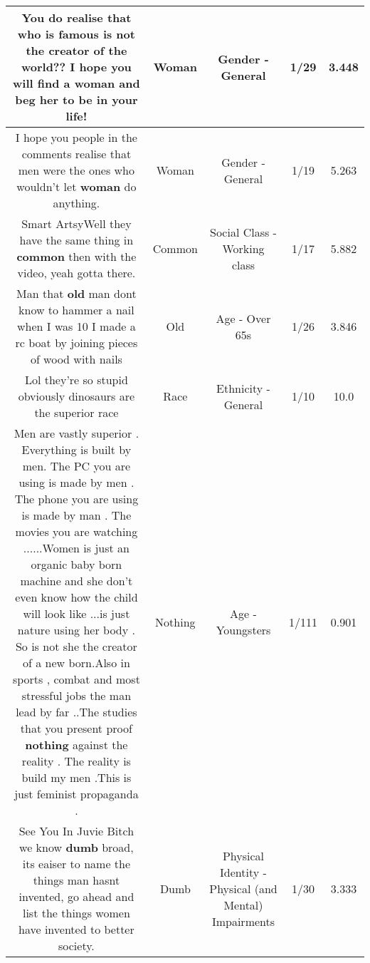 \documentclass[11pt]{article}
\newlength\mylength
\begin{document}
\begin{center}
\begin{longtable}{|C{.65\mylength}|C{.30\mylength}|C{.12\mylength}|C{.12\mylength}|C{.12\mylength}|}
  \small You do realise that who is famous is not the creator of the world?? I hope you will find a \textbf{woman} and beg her to be in your life!\normalsize   & Woman & Gender - General & 1/29 & 3.448 \\  \hline
  \small I hope you people in the comments realise that men were the ones who wouldn't let \textbf{woman} do anything.\normalsize   & Woman & Gender - General & 1/19 & 5.263 \\  \hline
  \small Smart ArtsyWell they have the same thing in \textbf{common} then with the video, yeah gotta there.\normalsize   & Common & Social Class - Working class & 1/17 & 5.882 \\  \hline
  \small Man that \textbf{old} man dont know to hammer a nail when I was 10 I made a rc boat by joining pieces of wood with nails\normalsize   & Old & Age - Over 65s & 1/26 & 3.846 \\  \hline
  \small Lol they're so stupid obviously dinosaurs are the superior race\normalsize   & Race & Ethnicity - General & 1/10 & 10.0 \\  \hline
  \small Men are vastly superior . Everything is built by men. The PC you are using is made by men . The phone you are using is made by man . The movies you are watching ......Women is just an organic baby born machine and she don't even know how the child will look like ...is just nature using her body . So is not she the creator of a new born.Also in sports , combat and most stressful jobs the man lead by far ..The studies that you present proof \textbf{nothing} against the reality . The reality is build my men .This is just feminist propaganda .\normalsize   & Nothing & Age - Youngsters & 1/111 & 0.901 \\  \hline
  \small See You In Juvie Bitch we know \textbf{dumb} broad, its eaiser to name the things man hasnt invented, go ahead and list the things women have invented to better society.\normalsize   & Dumb & Physical Identity - Physical (and Mental) Impairments & 1/30 & 3.333 \\  \hline

\end{longtable}
\end{center}
\end{document}

